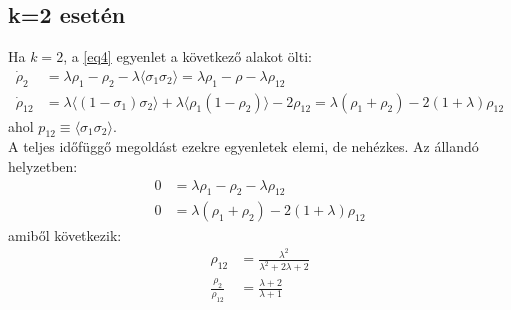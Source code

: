 \documentclass{article}
\begin{document}
	\subsection{k=2 esetén}
	Ha $k=2$, a \ref{eq4} egyenlet a következő alakot ölti:
	\begin{align*}
		\dot{\rho}_2 &= \lambda\rho_1-\rho_2-\lambda\langle\sigma_1\sigma_2\rangle=\lambda\rho_1-\rho-\lambda\rho_{12}\\
		\dot{\rho}_{12}&=\lambda\langle(1-\sigma_1)\sigma_2\rangle+\lambda\langle\rho_1(1-\rho_2)\rangle-2\rho_{12}=\lambda(\rho_1+\rho_2)-2(1+\lambda)\rho_{12}
	\end{align*}
	ahol $p_{12} \equiv \langle\sigma_1\sigma_2\rangle$.\\
	A teljes időfüggő megoldást ezekre egyenletek elemi, de nehézkes. Az állandó helyzetben:
	\begin{align*}
		0&=\lambda\rho_1-\rho_2-\lambda\rho_{12}\\
		0&=\lambda(\rho_1+\rho_2)-2(1+\lambda)\rho_{12}
	\end{align*}
	amiből következik:
	\begin{align*}
		\rho_{12}&=\frac{\lambda^2}{\lambda^2+2\lambda+2}\\
		\frac{\rho_2}{\rho_{12}} &= \frac{\lambda+2}{\lambda+1}
	\end{align*}
\end{document}
